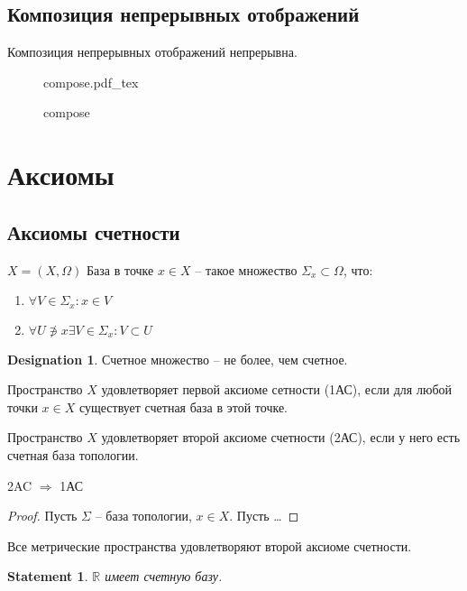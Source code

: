 \documentclass[11pt]{book}
\newcommand{\incfig}[1]{%
    \def\svgwidth{\columnwidth}
    {#1.pdf_tex}
}
\newcommand{\R}{\mathbb{R}}
\theoremstyle{definition}
\theoremstyle{plain}
\theoremstyle{plain}
\newtheorem*{st}{Statement}
\theoremstyle{definition}
\newtheorem*{name}{Designation}
\theoremstyle{remark}
\begin{document}
\subsection{Композиция непрерывных отображений}
\begin{thm}
    Композиция непрерывных отображений непрерывна.
\begin{figure}[ht]
    \centering
    \incfig{compose}
    \caption{compose}
    \label{fig:compose}
\end{figure}
\end{thm}
\section{Аксиомы}
\subsection{Аксиомы счетности}
\begin{defn}
    $ X = (X , \Omega )$  
    База в точке $ x \in  X$ -- такое множество $ \Sigma _x \subset \Omega $, что:
    \begin{enumerate}
        \item $ \forall V \in  \Sigma _x: x \in  V$
	\item $ \forall U \not\ni x \exists V \in  \Sigma _x: V \subset U$
    \end{enumerate}
    
\end{defn}
\begin{name}
    Счетное множество -- не более, чем счетное.
\end{name}
\begin{defn}
    Пространство $ X$ удовлетворяет первой аксиоме сетности (1АС), если для любой точки $ x \in  X$ существует счетная база в этой точке.
\end{defn}
\begin{defn}
    Пространство $ X$ удовлетворяет второй аксиоме счетности (2АС), если у него есть счетная база топологии.
\end{defn}
\begin{thm}
    2AC  $ \Rightarrow $ 1АС
\end{thm}
\begin{proof}
    Пусть $  \Sigma  $ -- база топологии, $ x \in X$. Пусть \ldots 
\end{proof}
\begin{thm}
    Все метрические пространства удовлетворяют второй аксиоме счетности.
\end{thm}
\begin{st}
    $ \R$ имеет счетную базу.
\end{st}
\end{document}
